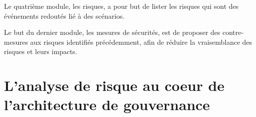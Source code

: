 Le quatrième module, les risques, a pour but de lister les risques qui sont des événements redoutés lié à des scénarios.

Le but du dernier module, les mesures de sécurités, est de proposer des contre-mesures aux risques identifiés précédemment, afin de réduire la vraisemblance des risques et leurs impacts.

\section{L'analyse de risque au coeur de l'architecture de gouvernance}


\utodo


%
%
%
%
%
%
%
%
%
%

